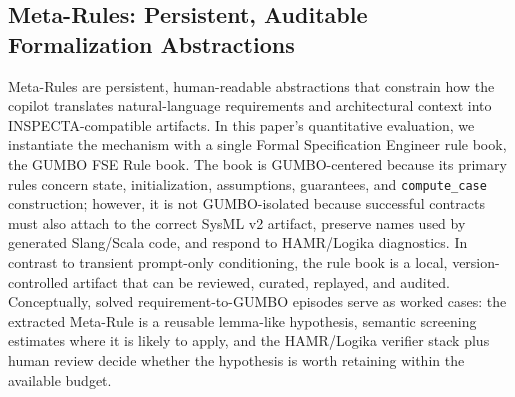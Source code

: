 \documentclass[conference]{IEEEtran}
\begin{document}
\subsection{Meta-Rules: Persistent, Auditable Formalization Abstractions}
Meta-Rules are persistent, human-readable abstractions that constrain how the copilot translates natural-language requirements and architectural context into INSPECTA-compatible artifacts. In this paper's quantitative evaluation, we instantiate the mechanism with a single Formal Specification Engineer rule book, the GUMBO FSE Rule book. The book is GUMBO-centered because its primary rules concern state, initialization, assumptions, guarantees, and \texttt{compute\_case} construction; however, it is not GUMBO-isolated because successful contracts must also attach to the correct SysML v2 artifact, preserve names used by generated Slang/Scala code, and respond to HAMR/Logika diagnostics. In contrast to transient prompt-only conditioning, the rule book is a local, version-controlled artifact that can be reviewed, curated, replayed, and audited. Conceptually, solved requirement-to-GUMBO episodes serve as worked cases: the extracted Meta-Rule is a reusable lemma-like hypothesis, semantic screening estimates where it is likely to apply, and the HAMR/Logika verifier stack plus human review decide whether the hypothesis is worth retaining within the available budget.


\end{document}
